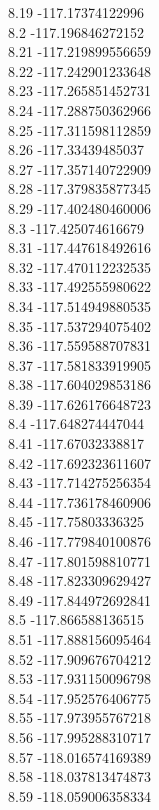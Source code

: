 {8.19	-117.17374122996\\
8.2	-117.196846272152\\
8.21	-117.219899556659\\
8.22	-117.242901233648\\
8.23	-117.265851452731\\
8.24	-117.288750362966\\
8.25	-117.311598112859\\
8.26	-117.33439485037\\
8.27	-117.357140722909\\
8.28	-117.379835877345\\
8.29	-117.402480460006\\
8.3	-117.425074616679\\
8.31	-117.447618492616\\
8.32	-117.470112232535\\
8.33	-117.492555980622\\
8.34	-117.514949880535\\
8.35	-117.537294075402\\
8.36	-117.559588707831\\
8.37	-117.581833919905\\
8.38	-117.604029853186\\
8.39	-117.626176648723\\
8.4	-117.648274447044\\
8.41	-117.67032338817\\
8.42	-117.692323611607\\
8.43	-117.714275256354\\
8.44	-117.736178460906\\
8.45	-117.75803336325\\
8.46	-117.779840100876\\
8.47	-117.801598810771\\
8.48	-117.823309629427\\
8.49	-117.844972692841\\
8.5	-117.866588136515\\
8.51	-117.888156095464\\
8.52	-117.909676704212\\
8.53	-117.931150096798\\
8.54	-117.952576406775\\
8.55	-117.973955767218\\
8.56	-117.995288310717\\
8.57	-118.016574169389\\
8.58	-118.037813474873\\
8.59	-118.059006358334\\
}

